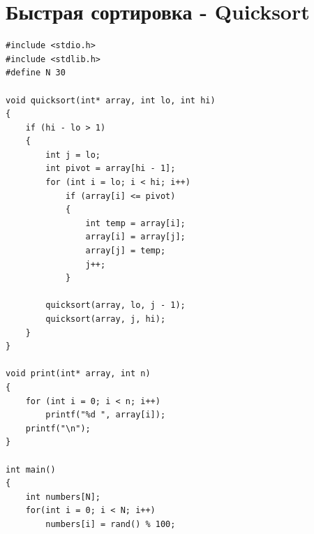 \documentclass{article}
\begin{document}
\section*{Быстрая сортировка - Quicksort}
\begin{multicols}{2}
\begin{lstlisting}
#include <stdio.h>
#include <stdlib.h>
#define N 30

void quicksort(int* array, int lo, int hi)
{
    if (hi - lo > 1)
    {
        int j = lo;
        int pivot = array[hi - 1];
        for (int i = lo; i < hi; i++)
            if (array[i] <= pivot)
            {
                int temp = array[i];
                array[i] = array[j];
                array[j] = temp;
                j++;
            }

        quicksort(array, lo, j - 1);
        quicksort(array, j, hi);
    }
}

void print(int* array, int n)
{
    for (int i = 0; i < n; i++)
        printf("%d ", array[i]);
    printf("\n");
}

int main()
{
    int numbers[N];
    for(int i = 0; i < N; i++)
        numbers[i] = rand() % 100;
    

\end{lstlisting}
\end{multicols}
\end{document}
